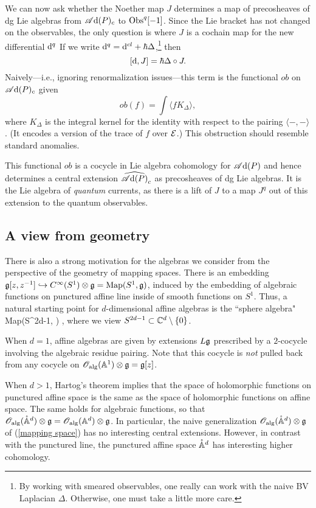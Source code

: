 We can now ask whether the Noether map $J$ determines a map of precosheaves of dg Lie algebras from $\mathscr A{\rm d}(P)_c$ to ${\rm Obs}^q[-1]$.
Since the Lie bracket has not changed on the observables, 
the only question is where $J$ is a cochain map for the new differential ${\rm d}^q$
If we write ${\rm d}^q = {\rm d}^{cl} + \hbar \Delta$,\footnote{By working with smeared observables, one really can work with the naive BV Laplacian $\Delta$. Otherwise, one must take a little more care.} then 
\[
[{\rm d},J] = \hbar \Delta \circ J.
\]
Naively---i.e., ignoring renormalization issues---this term is the functional $ob$ on $\mathscr A{\rm d}(P)_c$ given 
\[
ob(f) = \int \langle f K_\Delta \rangle,
\]
where $K_\Delta$ is the integral kernel for the identity with respect to the pairing $\langle-,-\rangle$.
(It encodes a version of the trace of $f$ over $\mathcal E$.)
This obstruction should resemble standard anomalies.

This functional $ob$ is a cocycle in Lie algebra cohomology for $\mathscr A{\rm d}(P)$ and hence determines a central extension $\widehat{\mathscr A{\rm d}(P)}_c$ as precosheaves of dg Lie algebras.
It is the Lie algebra of {\em quantum} currents, as there is a lift of $J$ to a map $J^q$ out of this extension to the quantum observables.

\subsection*{A view from geometry}

There is also a strong motivation for the algebras we consider from the perspective of the geometry of mapping spaces. 
There is an embedding $\mathfrak g[z,z^{-1}] \hookrightarrow C^\infty(S^1) \otimes \mathfrak g = {\rm Map}(S^1, \mathfrak g)$, induced by the embedding of algebraic functions on punctured affine line inside of smooth functions on $S^1$. 
Thus, a natural starting point for $d$-dimensional affine algebras is the ``sphere algebra" 
\beqn\label{mapping space}
{\rm Map}(S^{2d-1}, \fg) ,
\eeqn
where we view $S^{2d-1} \subset \mathbb C^d \setminus \{0\}$. 

When $d=1$, affine algebras are given by extensions $L\mathfrak g$ prescribed by a $2$-cocycle involving the algebraic residue pairing. 
Note that this cocycle is {\em not} pulled back from any cocycle on $\mathscr O_{\rm alg}(\mathbb A^1) \otimes \mathfrak g = \mathfrak g[z]$. 

When $d > 1$, Hartog's theorem implies that the space of holomorphic functions on punctured affine space is the same as the space of holomorphic functions on affine space.
The same holds for algebraic functions, so that $\mathscr O_{\rm alg}(\mathring{\mathbb A}^{d}) \otimes \mathfrak g = \mathscr O_{\rm alg}(\mathbb A^d) \otimes \mathfrak g$. 
In particular, the naive generalization $\mathscr O_{\rm alg}(\mathring{\mathbb A}^{d}) \otimes \mathfrak g$ of (\ref{mapping space}) has no interesting central extensions. 
However, in contrast with the punctured line, the punctured affine space $\mathring{\mathbb A}^{d}$ has interesting higher cohomology. 

